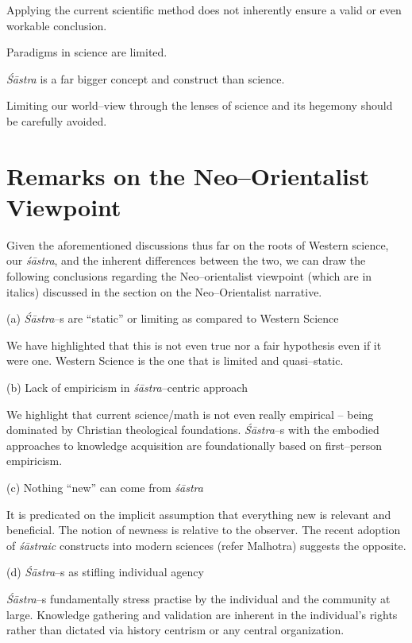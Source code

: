  \item Applying the current scientific method does not inherently ensure a valid or even workable conclusion.

 \item Paradigms in science are limited.

 \item \textit{Śāstra} is a far bigger concept and construct than science.

 \item Limiting our world–view through the lenses of science and its hegemony should be carefully avoided.



\section*{Remarks on the Neo–Orientalist Viewpoint}

Given the aforementioned discussions thus far on the roots of Western science, our \textit{śāstra}, and the inherent differences between the two, we can draw the following conclusions regarding the Neo–orientalist viewpoint (which are in italics) discussed in the section on the Neo–Orientalist narrative.

(a) \textit{Śāstra}–s are “static” or limiting as compared to Western Science

We have highlighted that this is not even true nor a fair hypothesis even if it were one. Western Science is the one that is limited and quasi–static.

(b) Lack of empiricism in \textit{śāstra}–centric approach

We highlight that current science/math is not even really empirical – being dominated by Christian theological foundations. \textit{Śāstra}–s with the embodied approaches to knowledge acquisition are foundationally based on first–person empiricism.

(c) Nothing “new” can come from \textit{śāstra}

It is predicated on the implicit assumption that everything new is relevant and beneficial. The notion of newness is relative to the observer. The recent adoption of \textit{śāstraic} constructs into modern sciences (refer Malhotra) suggests the opposite.

(d) \textit{Śāstra}–s as stifling individual agency

\textit{Śāstra}–s fundamentally stress practise by the individual and the community at large. Knowledge gathering and validation are inherent in the individual's rights rather than dictated via history centrism or any central organization.


